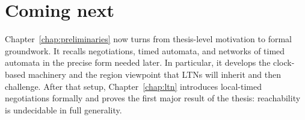 \section{Coming next}
\label{sec:intro-next}

Chapter~\ref{chap:preliminaries} now turns from thesis-level motivation to formal groundwork. It recalls negotiations, timed automata, and networks of timed automata in the precise form needed later. In particular, it develops the clock-based machinery and the region viewpoint that LTNs will inherit and then challenge. After that setup, Chapter~\ref{chap:ltn} introduces local-timed negotiations formally and proves the first major result of the thesis: reachability is undecidable in full generality.
